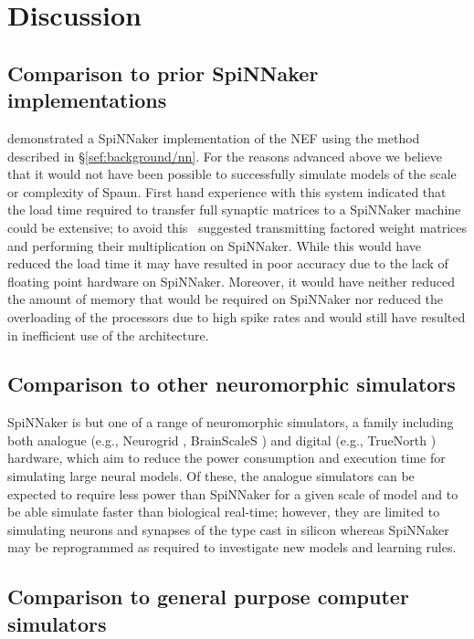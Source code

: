 \documentclass[conference]{IEEEtran}
\begin{document}
  \section{Discussion}

  \subsection{Comparison to prior SpiNNaker implementations}

  \textcite{Galluppi2012} demonstrated a SpiNNaker implementation of the NEF using the method described in \S\ref{sef:background/nn}.
  For the reasons advanced above we believe that it would not have been possible to successfully simulate models of the scale or complexity of Spaun.
  First hand experience with this system indicated that the load time required to transfer full synaptic matrices to a SpiNNaker machine could be extensive; to avoid this \citeauthor*{Galluppi2012}\ suggested transmitting factored weight matrices and performing their multiplication on SpiNNaker.
  While this would have reduced the load time it may have resulted in poor accuracy due to the lack of floating point hardware on SpiNNaker.
  Moreover, it would have neither reduced the amount of memory that would be required on SpiNNaker nor reduced the overloading of the processors due to high spike rates and would still have resulted in inefficient use of the architecture.

  \subsection{Comparison to other neuromorphic simulators}

  SpiNNaker is but one of a range of neuromorphic simulators, a family including both analogue (e.g., Neurogrid \parencite{Benjamin2014}, BrainScaleS \parencite{Schemmel2010}) and digital (e.g., TrueNorth \parencite{Merolla2014}) hardware, which aim to reduce the power consumption and execution time for simulating large neural models.
  Of these, the analogue simulators can be expected to require less power than SpiNNaker for a given scale of model \parencite{Stromatias2013} and to be able simulate faster than biological real-time; however, they are limited to simulating neurons and synapses of the type cast in silicon whereas SpiNNaker may be reprogrammed as required to investigate new models and learning rules.

  \subsection{Comparison to general purpose computer simulators}
\end{document}
